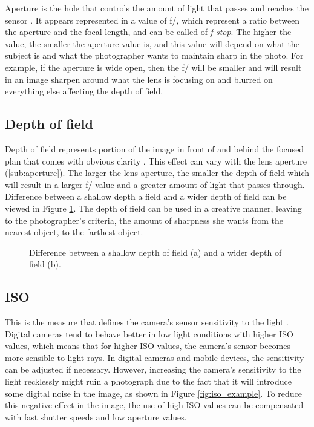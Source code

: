 Aperture is the hole that controls the amount of light that passes and reaches the sensor \cite{Kamps2012} \cite{Santos}. It appears represented in a value of f/, which represent a ratio between the aperture and the focal length, and can be called of \emph{f-stop}. The higher the value, the smaller the aperture value is, and this value will depend on what the subject is and what the photographer wants to maintain sharp in the photo. For example, if the aperture is wide open, then the f/ will be smaller and will result in an image sharpen around what the lens is focusing on and blurred on everything else affecting the depth of field.

\subsection{Depth of field}
\label{sub:depth_field}

Depth of field represents portion of the image in front of and behind the focused plan that comes with obvious clarity \cite{Kamps2012} \cite{Santos}. This effect can vary with the lens aperture (\ref{sub:aperture}). The larger the lens aperture, the smaller the depth of field which will result in a larger f/ value and a greater amount of light that passes through. Difference between a shallow depth a field and a wider depth of field can be viewed in Figure \ref{fig:depth_field_example}.
The depth of field can be used in a creative manner, leaving to the  photographer's criteria, the amount of sharpness she wants from the nearest object, to the farthest object.

\begin{figure}[htbp]
        \centering
  \caption{Difference between a shallow depth of field (a) and a wider depth of field (b). \cite{Kamps2012}}
  \label{fig:depth_field_example}
\end{figure}

\subsection{ISO}
\label{sub:iso}

This is the measure that defines the camera's sensor sensitivity to the light \cite{Kamps2012}. Digital cameras tend to behave better in low light conditions with higher ISO values, which means that for higher ISO values, the camera's sensor becomes more sensible to light rays.
In digital cameras and mobile devices, the sensitivity can be adjusted if necessary. However, increasing the camera's sensitivity to the light recklessly might ruin a photograph due to the fact that it will introduce some digital noise in the image, as shown in Figure \ref{fig:iso_example}. To reduce this negative effect in the image, the use of high ISO values can be compensated with fast shutter speeds and low aperture values.


